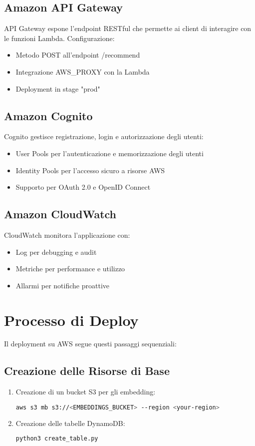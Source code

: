 \documentclass[11pt,a4paper]{article}
\begin{document}
\subsection{Amazon API Gateway}
API Gateway espone l'endpoint RESTful che permette ai client di interagire con le funzioni Lambda. Configurazione:

\begin{itemize}
  \item Metodo POST all'endpoint /recommend
  \item Integrazione AWS\_PROXY con la Lambda
  \item Deployment in stage "prod"
\end{itemize}

\subsection{Amazon Cognito}
Cognito gestisce registrazione, login e autorizzazione degli utenti:

\begin{itemize}
  \item User Pools per l'autenticazione e memorizzazione degli utenti
  \item Identity Pools per l'accesso sicuro a risorse AWS
  \item Supporto per OAuth 2.0 e OpenID Connect
\end{itemize}

\subsection{Amazon CloudWatch}
CloudWatch monitora l'applicazione con:

\begin{itemize}
  \item Log per debugging e audit
  \item Metriche per performance e utilizzo
  \item Allarmi per notifiche proattive
\end{itemize}

\section{Processo di Deploy}
Il deployment su AWS segue questi passaggi sequenziali:

\subsection{Creazione delle Risorse di Base}
\begin{enumerate}
  \item Creazione di un bucket S3 per gli embedding:
\begin{lstlisting}[language=bash]
aws s3 mb s3://<EMBEDDINGS_BUCKET> --region <your-region>
\end{lstlisting}

  \item Creazione delle tabelle DynamoDB:
\begin{lstlisting}[language=bash]
python3 create_table.py
\end{lstlisting}
\end{enumerate}
\end{document}
